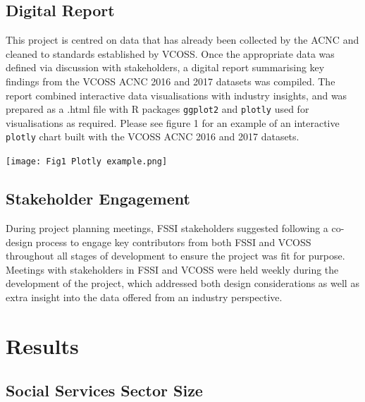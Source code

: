 \documentclass[
  11pt,
]{article}
\let\origfigure\figure
\let\endorigfigure\endfigure
\renewenvironment{figure}[1][2] {
    \expandafter\origfigure\expandafter[H]
} {
    \endorigfigure
}
\begin{document}
\hypertarget{digital-report}{%
\subsection{Digital Report}\label{digital-report}}

This project is centred on data that has already been collected by the ACNC and cleaned to standards established by VCOSS. Once the appropriate data was defined via discussion with stakeholders, a digital report summarising key findings from the VCOSS ACNC 2016 and 2017 datasets was compiled. The report combined interactive data visualisations with industry insights, and was prepared as a .html file with R packages \texttt{ggplot2} and \texttt{plotly} used for visualisations as required. Please see figure 1 for an example of an interactive \texttt{plotly} chart built with the VCOSS ACNC 2016 and 2017 datasets.

\begin{figure}
\centering
\texttt{[image: Fig1 Plotly example.png]}
\caption{A \texttt{Plotly} interactive plot using the ACNC dataset to visualise funding sources for each main activity}
\end{figure}

\hypertarget{stakeholder-engagement}{%
\subsection{Stakeholder Engagement}\label{stakeholder-engagement}}

During project planning meetings, FSSI stakeholders suggested following a co-design process to engage key contributors from both FSSI and VCOSS throughout all stages of development to ensure the project was fit for purpose. Meetings with stakeholders in FSSI and VCOSS were held weekly during the development of the project, which addressed both design considerations as well as extra insight into the data offered from an industry perspective.

\hypertarget{results}{%
\section{Results}\label{results}}

\hypertarget{social-services-sector-size}{%
\subsection{Social Services Sector Size}\label{social-services-sector-size}}
\end{document}

